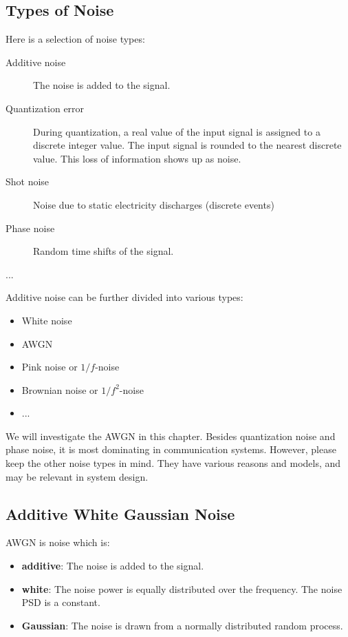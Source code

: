 \begin{refsection}
\subsection{Types of Noise}

Here is a selection of  noise types:
\begin{description}
	\item[Additive noise] The noise is added to the signal.
	\item[Quantization error] During quantization, a real value of the input signal is assigned to a discrete integer value. The input signal is rounded to the nearest discrete value. This loss of information shows up as noise.
	\item[Shot noise] Noise due to static electricity discharges (discrete events)
	\item[Phase noise] Random time shifts of the signal.
	\item[...]
\end{description}

Additive noise can be further divided into various types:
\begin{itemize}
	\item White noise
	\item \ac{AWGN}
	\item Pink noise or $1/f$-noise
	\item Brownian noise or $1/f^2$-noise
	\item ...
\end{itemize}

We will investigate the \ac{AWGN} in this chapter. Besides quantization noise and phase noise, it is most dominating in communication systems. However, please keep the other noise types in mind. They have various reasons and models, and may be relevant in system design.

\subsection{Additive White Gaussian Noise}

 \ac{AWGN} is noise which is:
\begin{itemize}
	\item \textbf{additive}: The noise is added to the signal.
	\item \textbf{white}: The noise power is equally distributed over the frequency. The noise \ac{PSD} is a constant.
	\item \textbf{Gaussian}: The noise is drawn from a normally distributed random process.
\end{itemize}


\end{refsection}
